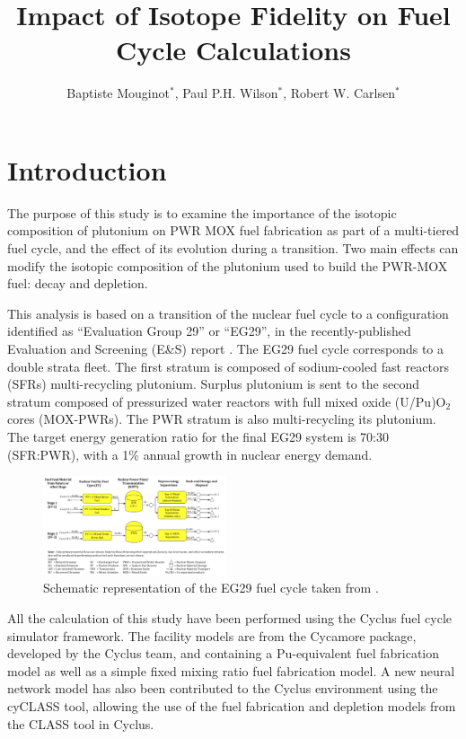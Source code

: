 \documentclass{anstrans}
\title{Impact of Isotope Fidelity on Fuel Cycle Calculations}
\author{ Baptiste Mouginot$^{*}$, Paul P.H. Wilson$^{*}$, Robert W. Carlsen$^{*}$ }
\institute{
$^{*}$University of Wisconsin-Madison, WI
}
\begin{document}
\section{Introduction} 

The purpose of this study is to examine the importance of the isotopic
composition of plutonium on PWR MOX fuel fabrication as part of a multi-tiered
fuel cycle, and the effect of its evolution during a transition. Two main
effects can modify the isotopic composition of the plutonium used to build the
PWR-MOX fuel: decay and depletion.

This analysis is based on a transition of the nuclear fuel cycle
to a configuration identified as ``Evaluation Group 29'' or ``EG29'', in the
recently-published Evaluation and Screening (E\&S) report \cite{ES}.  The EG29 fuel
cycle corresponds to a double strata fleet. The first stratum is composed of
sodium-cooled fast reactors (SFRs) multi-recycling plutonium. Surplus
plutonium is sent to the second stratum composed of pressurized water
reactors with full mixed oxide (U/Pu)O$_{2}$ cores (MOX-PWRs).  The PWR stratum
is also multi-recycling its plutonium. The target energy generation ratio for
the final EG29 system is 70:30 (SFR:PWR), with a 1\% annual growth in nuclear
energy demand.

\begin{figure}[ht] %
  \centering
  \includegraphics[width=0.48\textwidth]{FCDP_cycle}
  \caption{Schematic representation of the EG29 fuel cycle taken from \cite{FCDP}.}
  \label{fig:FCDP}
\end{figure}

All the calculation of this study have been performed using the Cyclus fuel
cycle simulator framework\cite{CYCLUS}. The facility models are from the
Cycamore package, developed by the Cyclus team, and containing a Pu-equivalent
fuel fabrication model as well as a simple fixed mixing ratio fuel fabrication
model. A new neural network model has also been contributed to the Cyclus
environment using the cyCLASS tool\cite{cyCLASS}, allowing the use of the fuel
fabrication and depletion models from the CLASS tool \cite{CLASS} in Cyclus.
\end{document}
